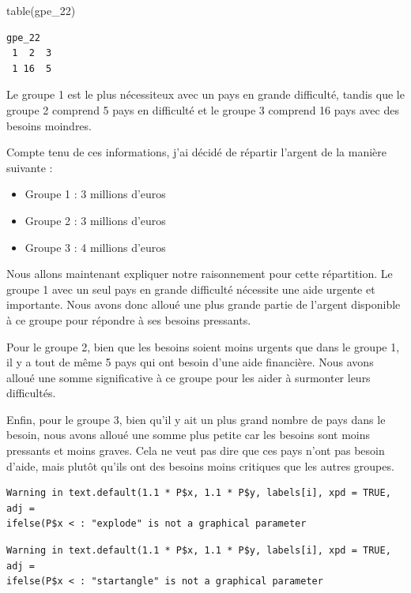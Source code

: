 \documentclass[
]{article}
\newenvironment{Shaded}{}{}
\newcommand{\FunctionTok}[1]{#1}
\newcommand{\NormalTok}[1]{#1}
\begin{document}
\begin{Shaded}
\begin{Highlighting}[]
\FunctionTok{table}\NormalTok{(gpe\_22)}
\end{Highlighting}
\end{Shaded}

\begin{verbatim}
gpe_22
 1  2  3 
 1 16  5 
\end{verbatim}

Le groupe 1 est le plus nécessiteux avec un pays en grande difficulté,
tandis que le groupe 2 comprend 5 pays en difficulté et le groupe 3
comprend 16 pays avec des besoins moindres.

Compte tenu de ces informations, j'ai décidé de répartir l'argent de la
manière suivante :

\begin{itemize}
\item
  Groupe 1 : 3 millions d'euros
\item
  Groupe 2 : 3 millions d'euros
\item
  Groupe 3 : 4 millions d'euros
\end{itemize}

Nous allons maintenant expliquer notre raisonnement pour cette
répartition. Le groupe 1 avec un seul pays en grande difficulté
nécessite une aide urgente et importante. Nous avons donc alloué une
plus grande partie de l'argent disponible à ce groupe pour répondre à
ses besoins pressants.

Pour le groupe 2, bien que les besoins soient moins urgents que dans le
groupe 1, il y a tout de même 5 pays qui ont besoin d'une aide
financière. Nous avons alloué une somme significative à ce groupe pour
les aider à surmonter leurs difficultés.

Enfin, pour le groupe 3, bien qu'il y ait un plus grand nombre de pays
dans le besoin, nous avons alloué une somme plus petite car les besoins
sont moins pressants et moins graves. Cela ne veut pas dire que ces pays
n'ont pas besoin d'aide, mais plutôt qu'ils ont des besoins moins
critiques que les autres groupes.

\begin{verbatim}
Warning in text.default(1.1 * P$x, 1.1 * P$y, labels[i], xpd = TRUE, adj =
ifelse(P$x < : "explode" is not a graphical parameter
\end{verbatim}

\begin{verbatim}
Warning in text.default(1.1 * P$x, 1.1 * P$y, labels[i], xpd = TRUE, adj =
ifelse(P$x < : "startangle" is not a graphical parameter
\end{verbatim}
\end{document}
